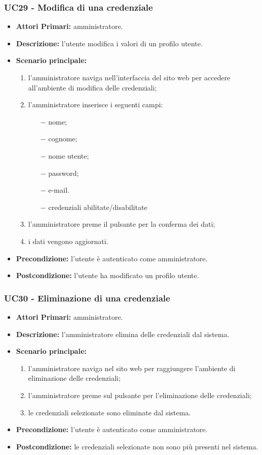 \subsubsection{ UC29 - Modifica di una credenziale}
\begin{itemize}
	\item\textbf{Attori Primari:} 
	amministratore.
	\item\textbf{Descrizione:} 
	l'utente modifica i valori di un profilo utente.
	\item\textbf{Scenario principale:} 
	\begin{enumerate}
		\item l'amministratore naviga nell'interfaccia del sito web per accedere all'ambiente di modifica delle credenziali;
		\item l'amministratore inserisce i seguenti campi:
		\begin{itemize}
			\item[$-$] nome;
			\item[$-$] cognome;
			\item[$-$] nome utente;
			\item[$-$] password;
			\item[$-$] e-mail.
			\item[$-$] credenziali abilitate/disabilitate
		\end{itemize}		
		\item l'amministratore preme il pulsante per la conferma dei dati;
		\item i dati vengono aggiornati.
	\end{enumerate}
	\item\textbf{Precondizione:} 
	l'utente è autenticato come amministratore.
	\item\textbf{Postcondizione:}
	l'utente ha modificato un profilo utente.
\end{itemize}

\subsubsection{ UC30 - Eliminazione di una credenziale}
\begin{itemize}
	\item\textbf{Attori Primari:} 
	amministratore.
	\item\textbf{Descrizione:} 
	l'amministratore elimina delle credenziali dal sistema.
	\item\textbf{Scenario principale:} 
	\begin{enumerate}
		\item l'amministratore naviga nel sito web per raggiungere l'ambiente di eliminazione delle credenziali;
		\item l'amministratore preme sul pulsante per l'eliminazione delle credenziali;
		\item le credenziali selezionate sono eliminate dal sistema.
	\end{enumerate}
	\item\textbf{Precondizione:} 
	l'utente è autenticato come amministratore.
	\item\textbf{Postcondizione:}
	le credenziali selezionate non sono più presenti nel sistema.
\end{itemize}

